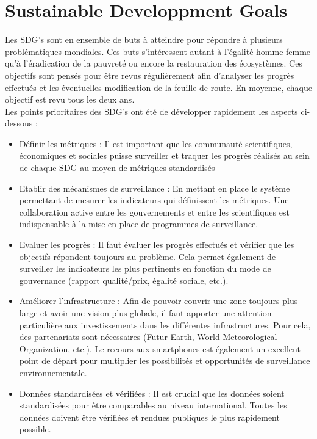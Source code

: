 \documentclass[10pt, article]{llncs}
\begin{document}
\section{Sustainable Developpment Goals}
		Les SDG's sont en ensemble de buts à atteindre pour répondre à plusieurs problématiques mondiales. Ces buts s'intéressent autant à l'égalité homme-femme qu'à l'éradication de la pauvreté ou encore la restauration des écosystèmes. Ces objectifs sont pensés pour être revus régulièrement afin d'analyser les progrès effectués et les éventuelles modification de la feuille de route. En moyenne, chaque objectif est revu tous les deux ans. \\
		Les points prioritaires des SDG's ont été de développer rapidement les aspects ci-dessous \cite{lu_policy:_2015} :
		\begin{itemize}
			\item Définir les métriques : Il est important que les communauté scientifiques, économiques et sociales puisse surveiller et traquer les progrès réalisés au sein de chaque SDG au moyen de métriques standardisés
			\item Etablir des mécanismes de surveillance : En mettant en place le système permettant de mesurer les indicateurs qui définissent les métriques. Une collaboration active entre les gouvernements et entre les scientifiques est indispensable à la mise en place de programmes de surveillance. 
			\item Evaluer les progrès : Il faut évaluer les progrès effectués et vérifier que les objectifs répondent toujours au problème. Cela permet également de surveiller les indicateurs les plus pertinents en fonction du mode de gouvernance (rapport qualité/prix, égalité sociale, etc.).
			\item Améliorer l'infrastructure : Afin de pouvoir couvrir une zone toujours plus large et avoir une vision plus globale, il faut apporter une attention particulière aux investissements dans les différentes infrastructures. Pour cela, des partenariats sont nécessaires (Futur Earth, World Meteorological Organization, etc.). Le recours aux smartphones est également un excellent point de départ pour multiplier les possibilités et opportunités de surveillance environnementale.
			\item Données standardisées et vérifiées : Il est crucial que les données soient standardisées pour être comparables au niveau international. Toutes les données doivent être vérifiées et rendues publiques le plus rapidement possible.
		\end{itemize}
\end{document}

